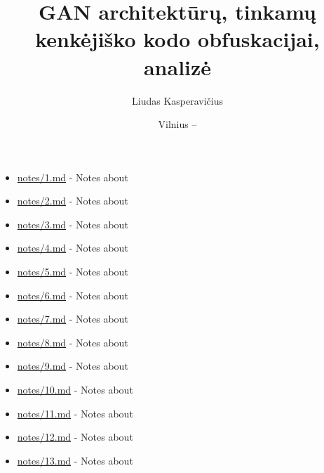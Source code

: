 \documentclass[
    lithuanian, %
]{VUMIFPSkursinis}
\title{GAN architektūrų, tinkamų kenkėjiško kodo obfuskacijai, analizė}
\author{Liudas Kasperavičius}
\date{Vilnius – \the\year}
\begin{document}


\maketitle

\tableofcontents


\begin{itemize}
    \item \url{notes/1.md} - Notes about \cite{nguyenGenerativeAdversarialNetworks2023}
    \item \url{notes/2.md} - Notes about \cite{zhongMalFoxCamouflagedAdversarial2024}
    \item \url{notes/3.md} - Notes about \cite{zhongReinforcementLearningBased2022}
    \item \url{notes/4.md} - Notes about \cite{kawaiImprovedMalGANAvoiding2019}
    \item \url{notes/5.md} - Notes about \cite{huGeneratingAdversarialMalware2017}
    \item \url{notes/6.md} - Notes about \cite{fangEvadingMalwareEngines2019}
    \item \url{notes/7.md} - Notes about \cite{zhuNgramMalGANEvading2022}
    \item \url{notes/8.md} - Notes about \cite{castroAIMEDEvolvingMalware2019}
    \item \url{notes/9.md} - Notes about \cite{andersonLearningEvadeStatic2018}
    \item \url{notes/10.md} - Notes about \cite{demetrioAdversarialEXEmplesSurvey2021}
    \item \url{notes/11.md} - Notes about \cite{yusteOptimizationCodeCaves2022}
    \item \url{notes/12.md} - Notes about \cite{chenInfoGANInterpretableRepresentation2016a}
    \item \url{notes/13.md} - Notes about \cite{demetrioFunctionalityPreservingBlackBoxOptimization2021}
\end{itemize}




\printbibliography[heading=bibintoc]

\printacronyms[heading=none]

\end{document}
